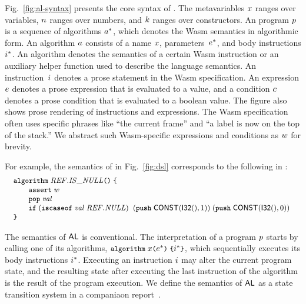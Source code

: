 Fig.~\ref{fig:al-syntax} presents the core syntax of \al.
The metavariables $x$ ranges over variables,
$n$ ranges over numbers, and
$k$ ranges over constructors.
An \al program $p$ is a sequence of algorithms $a^*$,
which denotes the Wasm semantics in algorithmic form.
An algorithm $a$ consists of a name $x$, parameters~$e^*$,
and body instructions $i^*$. An algorithm denotes the semantics of a
certain Wasm instruction or an auxiliary helper function used to describe the language semantics.
An instruction~$i$ denotes a prose statement in the Wasm specification.
An expression $e$ denotes a prose expression that is evaluated to a value, and
a condition $c$ denotes a prose condition that is evaluated to a boolean value.
The figure also shows prose rendering of instructions and expressions.
The Wasm specification often uses specific phrases like ``the current frame'' and
``a label is now on the top of the stack.''
We abstract such Wasm-specific expressions and conditions as $w$ for brevity.

For example, the semantics of 
in Fig.~\ref{fig:dsl} corresponds to the following in \al:
\[
\small
\!\!
\begin{array}{l}
\texttt{\small algorithm} \; \mathit{REF.IS\_NULL} \texttt{\small (} \texttt{\small )} \; \texttt{\small \{} \\
\qquad \texttt{\small assert} \; w \\
\qquad \texttt{\small pop} \; \mathit{val}\\
\qquad \texttt{\small if} \; (\texttt{\small iscaseof} \; \mathit{val} \; \mathit{REF.NULL})\;
\; (\texttt{\small push} \; \mathsf{CONST}(\mathsf{I32}(), 1)) \; (\texttt{\small push} \; \mathsf{CONST}(\mathsf{I32}(), 0))\\
\texttt{\small \}}
\end{array}
\]

The semantics of $\textsf{AL}$ is conventional.
The interpretation of a program $p$ starts by calling one of its algorithms,
$\texttt{\small algorithm} \; x \texttt{\small (} e^* \texttt{\small )} \; \texttt{\small \{} i^* \texttt{\small \}}$,
which sequentially executes its body instructions $i^*$.
Executing an instruction $i$ may alter the current program state,
and the resulting state after executing the last instruction of the algorithm
is the result of the program execution.
We define the semantics of $\textsf{AL}$ as a state transition system in a companiaon report~\cite{il-tr}.

